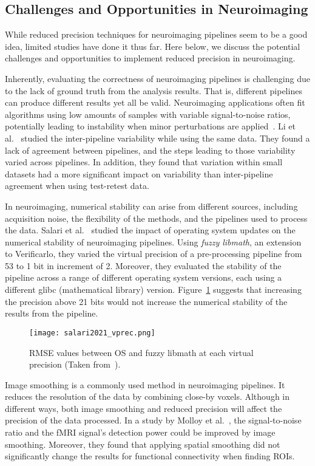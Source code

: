 \subsection{Challenges and Opportunities in Neuroimaging}
While reduced precision techniques for neuroimaging pipelines seem to be a
good idea, limited studies have done it thus far.
Here below, we discuss the potential challenges and opportunities to implement
reduced precision in neuroimaging.
	
Inherently, evaluating the correctness of neuroimaging pipelines is challenging due to the lack of ground truth from the analysis results.
That is, different pipelines can produce different results yet all be valid.
Neuroimaging applications often fit algorithms using low amounts of samples with variable
signal-to-noise ratios, potentially leading to instability when minor perturbations are applied~\cite{Kiar2020-uv}.
Li et al.~\cite{Li2021-om} studied the inter-pipeline variability while using the same data.
They found a lack of agreement between pipelines, and the steps leading to those variability varied across pipelines.
In addition, they found that variation within small datasets had a more significant impact
on variability than inter-pipeline agreement when using test-retest data. 
	
In neuroimaging, numerical stability can arise from different sources, including
acquisition noise, the flexibility of the methods, and the pipelines used to process the data.
Salari et al.~\cite{Salari2021-kd} studied the impact of operating system updates on
the numerical stability of neuroimaging pipelines.
Using \textit{fuzzy libmath}, an extension to Verificarlo, they varied the virtual
precision of a pre-processing pipeline from 53 to 1 bit in increment of 2.
Moreover, they evaluated the stability of the pipeline across a range of different
operating system versions, each using a different glibc (mathematical library) version.
Figure~\ref{fig:salari2021_vprec} suggests that increasing the precision above 21 bits
would not increase the numerical stability of the results from the pipeline.
\begin{figure}[h]
	\centering
	\texttt{[image: salari2021\_vprec.png]}
	\caption{RMSE values between OS and fuzzy libmath at each virtual precision (Taken from~\cite{Salari2021-kd}).}
	\label{fig:salari2021_vprec}
\end{figure}

Image smoothing is a commonly used method in neuroimaging pipelines.
It reduces the resolution of the data by combining close-by voxels.
Although in different ways, both image smoothing and reduced precision will affect
the precision of the data processed.
In a study by Molloy et al.~\cite{Molloy2014-oc}, the signal-to-noise ratio and
the fMRI signal's detection power could be improved by image smoothing. 
Moreover, they found that applying spatial smoothing did not significantly change the
results for functional connectivity when finding ROIs.
	
